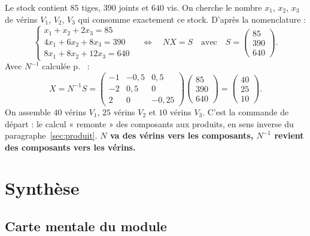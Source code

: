 \documentclass[a4paper,11pt]{article}
\newcommand{\M}[1]{\begin{pmatrix}#1\end{pmatrix}}
\begin{document}
\begin{appliindus}\label{ex:stock}
Le stock contient $85$ tiges, $390$ joints et $640$ vis. On cherche le nombre $x_1$, $x_2$, $x_3$ de vérins $V_1$, $V_2$, $V_3$ qui consomme exactement ce stock. D'après la nomenclature :
\[
\left\{\begin{array}{l} x_1 + x_2 + 2x_3 = 85\\ 4x_1 + 6x_2 + 8x_3 = 390\\ 8x_1 + 8x_2 + 12x_3 = 640\end{array}\right.
\quad\Longleftrightarrow\quad
NX = S \quad\text{avec}\quad S = \M{85\\390\\640}.
\]
Avec $N^{-1}$ calculée p.~\pageref{ex:inverseN} :
\[
X = N^{-1}S = \M{-1 & -0{,}5 & 0{,}5\\ -2 & 0{,}5 & 0\\ 2 & 0 & -0{,}25}\M{85\\390\\640} = \M{40\\25\\10}.
\]
On assemble $40$ vérins $V_1$, $25$ vérins $V_2$ et $10$ vérins $V_3$. C'est la commande de départ : le calcul « remonte » des composants aux produits, en sens inverse du paragraphe~\ref{sec:produit}. \textbf{$N$ va des vérins vers les composants, $N^{-1}$ revient des composants vers les vérins.}
\end{appliindus}

\newpage
\section{Synthèse}\label{sec:synthese}

\subsection{Carte mentale du module}\label{subsec:carte}
\end{document}
